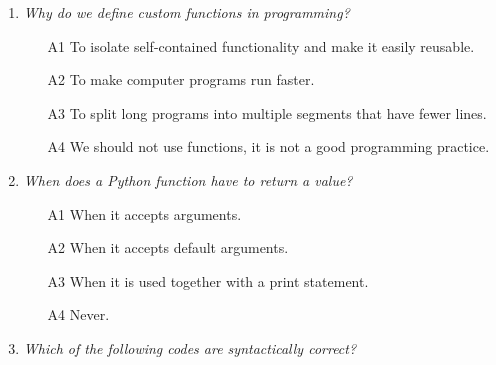 \begin{enumerate}

\item {\em Why do we define custom functions in programming? }\\

\begin{enumerate}
\item[A1] To isolate self-contained functionality and make it easily reusable.
\item[A2] To make computer programs run faster.
\item[A3] To split long programs into multiple segments that have fewer lines.
\item[A4] We should not use functions, it is not a good programming practice.
\end{enumerate}

\vspace{6mm}

\item {\em When does a Python function have to return a value? }\\

\begin{enumerate}
\item[A1] When it accepts arguments.
\item[A2] When it accepts default arguments.
\item[A3] When it is used together with a print statement.
\item[A4] Never.
\end{enumerate}

\vspace{6mm}

\item {\em Which of the following codes are syntactically correct?}\\


\end{enumerate}
